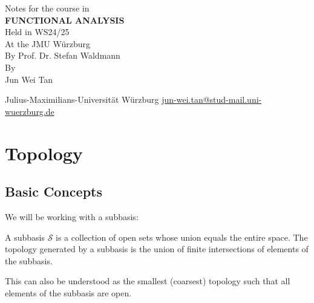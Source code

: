 \documentclass[twoside,symmetric, openany, 12pt]{./tuftebook}
\theoremstyle{definition}
\theoremstyle{definition}
\theoremstyle{definition}
\begin{document}
\begin{titlepage}
	{\begingroup%
		\centering
		{\Large Notes for the course in}\\[\baselineskip]
		{\Huge\bfseries FUNCTIONAL ANALYSIS}\\[\baselineskip]
		{\Large Held in WS24/25\\ At the JMU Würzburg\\ By Prof. Dr. Stefan Waldmann}\\[\baselineskip]
		{\LARGE By}\\[\baselineskip]
		{\LARGE Jun Wei Tan}\par
		\vfill
		{Julius-Maximilians-Universit\"{a}t W\"{u}rzburg}
		\vfill
		{\small\sffamily \href{mailto:jun-wei.tan@stud-mail.uni-wuerzburg.de}{jun-wei.tan@stud-mail.uni-wuerzburg.de}}\par
		\endgroup}
\end{titlepage}
\restoregeometry
	\tableofcontents
	\chapter{Topology}
	\section{Basic Concepts}
	We will be working with a subbasis:
	\begin{Definition}
		A subbasis $\mathcal{S}$ is a collection of open sets whose union equals the entire space. The topology generated by a subbasis is the union of finite intersections of elements of the subbasis.
	\end{Definition}
	This can also be understood as the smallest (coarsest) topology such that all elements of the subbasis are open.
	
\end{document}
